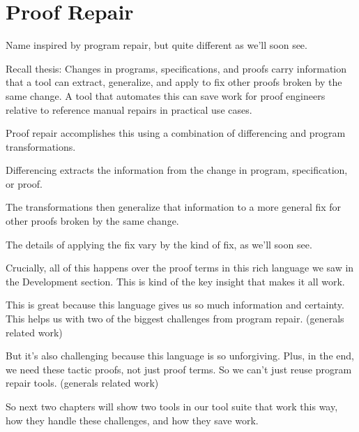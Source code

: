 \section{Proof Repair}
\label{sec:mot-rep}

Name inspired by program repair, but quite different as we'll soon see.

Recall thesis: Changes in programs, specifications, and proofs carry information that a tool can extract, generalize, and apply to fix other proofs broken by the same change. A tool that automates this can save work for proof engineers relative to reference manual repairs in practical use cases.

Proof repair accomplishes this using a combination of differencing and program transformations.

Differencing extracts the information from the change in program, specification, or proof.

The transformations then generalize that information to a more general fix for other proofs broken by the same change.

The details of applying the fix vary by the kind of fix, as we'll soon see.

Crucially, all of this happens over the proof terms in this rich language we saw in the Development section. This is kind of the key insight that makes it all work.

This is great because this language gives us so much information and certainty. This helps us with two of the biggest challenges from program repair. (generals related work)

But it's also challenging because this language is so unforgiving. Plus, in the end, we need these tactic proofs, not just proof terms. So we can't just reuse program repair tools. (generals related work)

So next two chapters will show two tools in our tool suite that work this way, how they handle these challenges, and how they save work.
